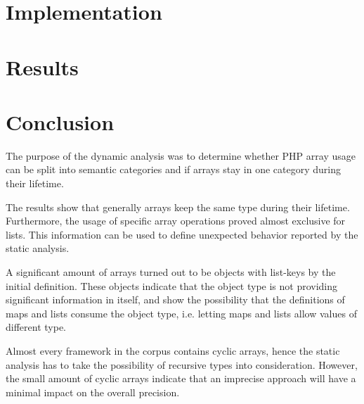 \section{Implementation}
\label{sec:studyImplementation}



%

\section{Results}
\label{sec:analysisResults}




\section{Conclusion}
\label{sec:studyConclusion}
The purpose of the dynamic analysis was to determine whether PHP array usage can be split into semantic categories and if arrays stay in one category during their lifetime. 

The results show that generally arrays keep the same type during their lifetime. Furthermore, the usage of specific array operations proved almost exclusive for lists. This information can be used to define unexpected behavior reported by the static analysis.

A significant amount of arrays turned out to be objects with list-keys by the initial definition. These objects indicate that the object type is not providing significant information in itself, and show the possibility that the definitions of maps and lists consume the object type, i.e. letting maps and lists allow values of different type.

Almost every framework in the corpus contains cyclic arrays, hence the static analysis has to take the possibility of recursive types into consideration. However, the small amount of cyclic arrays indicate that an imprecise approach will have a minimal impact on the overall precision.


